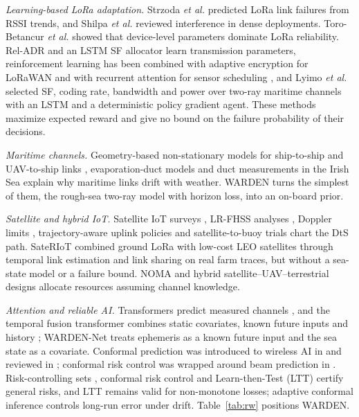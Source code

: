 \documentclass[journal]{IEEEtran}\def\WARDENieee{1}%
\begin{document}
\emph{Learning-based LoRa adaptation.} Strzoda \emph{et al.} \cite{b23} predicted LoRa link failures from RSSI trends, and Shilpa \emph{et al.} \cite{b24} reviewed interference in dense deployments. Toro-Betancur \emph{et al.} \cite{b41} showed that device-level parameters dominate LoRa reliability. Rel-ADR \cite{b26} and an LSTM SF allocator \cite{b27} learn transmission parameters, reinforcement learning has been combined with adaptive encryption for LoRaWAN \cite{b39} and with recurrent attention for sensor scheduling \cite{b40}, and Lyimo \emph{et al.} \cite{b25} selected SF, coding rate, bandwidth and power over two-ray maritime channels with an LSTM and a deterministic policy gradient agent. These methods maximize expected reward and give no bound on the failure probability of their decisions.

\emph{Maritime channels.} Geometry-based non-stationary models for ship-to-ship and UAV-to-ship links \cite{b9,b10}, evaporation-duct models \cite{b11} and duct measurements in the Irish Sea \cite{b12} explain why maritime links drift with weather. WARDEN turns the simplest of them, the rough-sea two-ray model with horizon loss, into an on-board prior.

\emph{Satellite and hybrid IoT.} Satellite IoT surveys \cite{b6,b7}, LR-FHSS analyses \cite{b15,b16}, Doppler limits \cite{b17}, trajectory-aware uplink policies \cite{b18} and satellite-to-buoy trials \cite{b19} chart the DtS path. SateRIoT \cite{b42} combined ground LoRa with low-cost LEO satellites through temporal link estimation and link sharing on real farm traces, but without a sea-state model or a failure bound. NOMA \cite{b13} and hybrid satellite--UAV--terrestrial designs \cite{b14} allocate resources assuming channel knowledge.

\emph{Attention and reliable AI.} Transformers predict measured channels \cite{b20,b21}, and the temporal fusion transformer combines static covariates, known future inputs and history \cite{b22}; WARDEN-Net treats ephemeris as a known future input and the sea state as a covariate. Conformal prediction was introduced to wireless AI in \cite{b29} and reviewed in \cite{b30}; conformal risk control was wrapped around beam prediction in \cite{b31}. Risk-controlling sets \cite{b32}, conformal risk control \cite{b33} and Learn-then-Test (LTT) \cite{b34} certify general risks, and LTT remains valid for non-monotone losses; adaptive conformal inference \cite{b35} controls long-run error under drift. Table~\ref{tab:rw} positions WARDEN.
\end{document}

